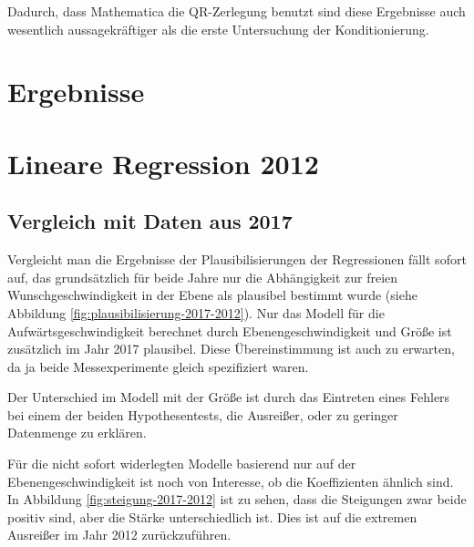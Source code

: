 Dadurch, dass Mathematica die QR-Zerlegung benutzt sind diese Ergebnisse auch wesentlich aussagekräftiger als die erste Untersuchung der Konditionierung.

\section{Ergebnisse}

\section{Lineare Regression 2012}


\subsection{Vergleich mit Daten aus 2017}

Vergleicht man die Ergebnisse der Plausibilisierungen der Regressionen fällt sofort auf, das grundsätzlich für beide Jahre nur die Abhängigkeit zur freien Wunschgeschwindigkeit in der Ebene als plausibel bestimmt wurde (siehe Abbildung \ref{fig:plausibilisierung-2017-2012}). Nur das Modell für die Aufwärtsgeschwindigkeit berechnet durch Ebenengeschwindigkeit und Größe ist zusätzlich im Jahr 2017 plausibel. Diese Übereinstimmung ist auch zu erwarten, da ja beide Messexperimente gleich spezifiziert waren.

Der Unterschied im Modell mit der Größe ist durch das Eintreten eines Fehlers bei einem der beiden Hypothesentests, die Ausreißer, oder zu geringer Datenmenge zu erklären.

Für die nicht sofort widerlegten Modelle basierend nur auf der Ebenengeschwindigkeit ist noch von Interesse, ob die Koeffizienten ähnlich sind. In Abbildung \ref{fig:steigung-2017-2012} ist zu sehen, dass die Steigungen zwar beide positiv sind, aber die 
Stärke unterschiedlich ist. Dies ist auf die extremen Ausreißer im Jahr 2012 zurückzuführen.

